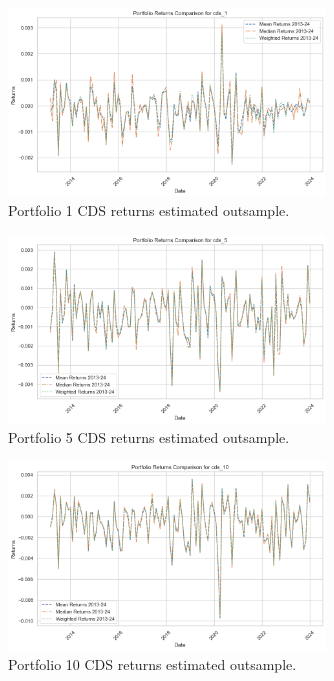\documentclass{article}
\begin{document}
\begin{Data science tools for finance final project}
\begin{figure}[H]
    \centering
    \includegraphics[width=0.75\textwidth]{../assets/returns_cds1_2013_2024.png}
    \caption{\label{fig:myplot}Portfolio 1 CDS returns estimated outsample.}
    \end{figure}

\begin{figure}[H]
    \centering
    \includegraphics[width=0.75\textwidth]{../assets/returns_cds5_2013_2024.png}
    \caption{\label{fig:myplot}Portfolio 5 CDS returns estimated outsample.}
    \end{figure}    

\begin{figure}[H]
    \centering
    \includegraphics[width=0.75\textwidth]{../assets/returns_cds10_2013_2024.png}
    \caption{\label{fig:myplot}Portfolio 10 CDS returns estimated outsample.}
    \end{figure}


\end{Data science tools for finance final project}
\end{document}
